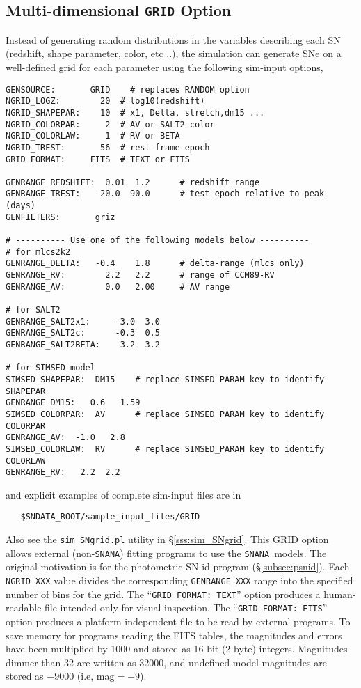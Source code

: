 \documentclass[12pt]{article}
\newcommand{\snana}{{\tt SNANA}}
\begin{document}
   \clearpage
   \subsection{Multi-dimensional {\tt GRID} Option}
   \label{ssec:grid}

\newcommand{\SNPARINFO}{SNPAR-INFO}
\newcommand{\ILC}{ILC}
\newcommand{\MAGPACK}{1000}


Instead of generating random distributions in the
variables describing each SN 
(redshift, shape parameter, color, etc ..),
the simulation can generate SNe on a well-defined
grid for each parameter using the following sim-input
options,

\begin{Verbatim}[frame=single]
GENSOURCE:       GRID    # replaces RANDOM option
NGRID_LOGZ:        20  # log10(redshift)
NGRID_SHAPEPAR:    10  # x1, Delta, stretch,dm15 ...
NGRID_COLORPAR:     2  # AV or SALT2 color
NGRID_COLORLAW:     1  # RV or BETA
NGRID_TREST:       56  # rest-frame epoch 
GRID_FORMAT:     FITS  # TEXT or FITS

GENRANGE_REDSHIFT:  0.01  1.2      # redshift range
GENRANGE_TREST:   -20.0  90.0      # test epoch relative to peak (days)
GENFILTERS:       griz

# ---------- Use one of the following models below ----------
# for mlcs2k2
GENRANGE_DELTA:   -0.4    1.8      # delta-range (mlcs only)
GENRANGE_RV:        2.2   2.2      # range of CCM89-RV
GENRANGE_AV:        0.0   2.00     # AV range

# for SALT2
GENRANGE_SALT2x1:     -3.0  3.0
GENRANGE_SALT2c:      -0.3  0.5
GENRANGE_SALT2BETA:    3.2  3.2

# for SIMSED model
SIMSED_SHAPEPAR:  DM15    # replace SIMSED_PARAM key to identify SHAPEPAR
GENRANGE_DM15:   0.6   1.59
SIMSED_COLORPAR:  AV      # replace SIMSED_PARAM key to identify COLORPAR
GENRANGE_AV:  -1.0   2.8
SIMSED_COLORLAW:  RV      # replace SIMSED_PARAM key to identify COLORLAW
GENRANGE_RV:   2.2  2.2
\end{Verbatim}
%
and explicit examples of complete sim-input files are in
\begin{verbatim}
   $SNDATA_ROOT/sample_input_files/GRID
\end{verbatim}
Also see the {\tt sim\_SNgrid.pl} utility in 
\S\ref{sss:sim_SNgrid}.
This GRID option allows external (non-{\snana}) fitting programs to
use the \snana\ models. The original motivation is for the
photometric SN id program  (\S\ref{subsec:psnid}).
Each {\tt NGRID\_XXX} value divides the 
corresponding {\tt GENRANGE\_XXX} range into the specified
number of bins for the grid.
The ``{\tt GRID\_FORMAT: TEXT}'' option produces a human-readable
file intended only for visual inspection.
The ``{\tt GRID\_FORMAT: FITS}'' option produces a platform-independent 
file to be read by external programs.
To save memory for programs reading the FITS tables,
the magnitudes and errors have been multiplied by {\MAGPACK}
and stored as 16-bit (2-byte) integers.
Magnitudes dimmer than 32 are written as 32000,
and undefined model magnitudes are stored as $-9000$
(i.e, mag$=-9$).
\end{document}

